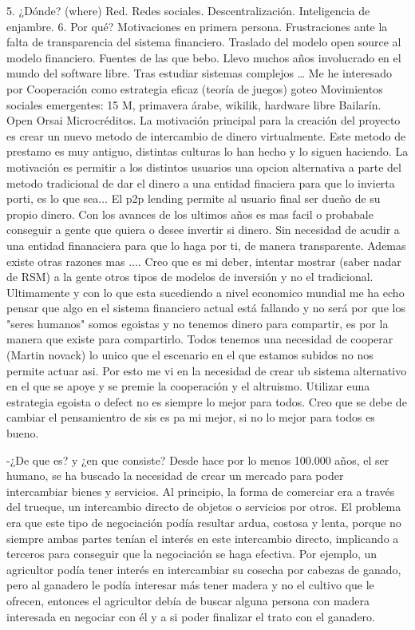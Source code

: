 5. ¿Dónde? (where) 
Red. Redes sociales.
Descentralización. Inteligencia de enjambre.
6. Por qué?
Motivaciones en primera persona.
Frustraciones ante la falta de transparencia del sistema financiero.
Traslado del modelo open source al modelo financiero. 
Fuentes de las que bebo.
Llevo muchos años involucrado en el mundo del software libre.
Tras estudiar sistemas complejos … 
Me he interesado por Cooperación como estrategia eficaz (teoría de juegos)
goteo
Movimientos sociales emergentes: 15 M, primavera  árabe, wikilik, hardware libre
Bailarín.
Open 
Orsai 
Microcréditos.
La motivación principal para la creación del proyecto es crear un nuevo metodo de intercambio de dinero virtualmente. Este metodo de prestamo es muy antiguo, distintas culturas lo han hecho y lo siguen haciendo. La motivación es permitir a los distintos usuarios una opcion alternativa a parte del metodo tradicional de dar el dinero a una entidad finaciera para que lo invierta porti, es lo que sea... El p2p lending permite al usuario final ser dueño de su propio dinero. Con los avances de los ultimos años es mas facil o probabale conseguir a gente que quiera o desee invertir si dinero. Sin necesidad de acudir a una entidad finanaciera para que lo haga por ti, de manera transparente. Ademas existe otras razones mas .... Creo que es mi deber, intentar mostrar (saber nadar de RSM) a la gente otros tipos de modelos de inversión y no el tradicional. Ultimamente y con lo que esta sucediendo a nivel economico mundial me ha echo pensar que algo en el sistema financiero actual está fallando y no será por que los "seres humanos" somos egoistas y no tenemos dinero para compartir, es por la manera que existe para compartirlo. Todos tenemos una necesidad de cooperar (Martin novack) lo unico que el escenario en el que estamos subidos no nos permite actuar asi. Por esto me vi en la necesidad de crear ub sistema alternativo en el que se apoye y se premie la cooperación y el altruismo. Utilizar euna estrategia egoista o defect no es siempre lo mejor para todos. Creo que se debe de cambiar el pensamientro de sis es pa mi mejor, si no lo mejor para todos es bueno.



-¿De que es? y ¿en que consiste?
Desde hace por lo menos 100.000 años, el ser humano, se ha buscado la necesidad de crear un mercado para poder intercambiar bienes y servicios. Al principio, la forma de comerciar era a través del trueque, un intercambio directo de objetos o servicios por otros. El problema era que este tipo de negociación podía resultar ardua, costosa y lenta, porque no siempre ambas partes tenían el interés en este intercambio directo, implicando a terceros para conseguir que la negociación se haga efectiva. Por ejemplo, un agricultor podía tener interés en intercambiar su cosecha por cabezas de ganado, pero al ganadero le podía interesar más tener madera y no el cultivo que le ofrecen, entonces el agricultor debía de buscar alguna persona con madera interesada en negociar con él y a si poder finalizar el trato con el ganadero. 

